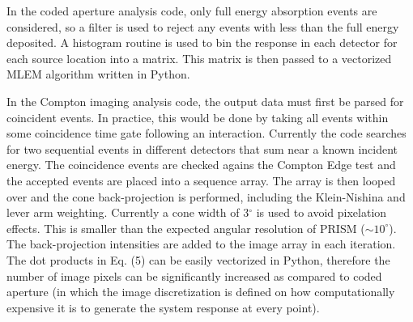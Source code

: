 \documentclass[10pt]{article}
\begin{document}

In the coded aperture analysis code, only full energy absorption events are considered, so a filter is used to reject any events with less than the full energy deposited. A histogram routine is used to bin the response in each detector for each source location into a matrix. This matrix is then passed to a vectorized MLEM algorithm written in Python.

%

In the Compton imaging analysis code, the output data must first be parsed for coincident events. In practice, this would be done by taking all events within some coincidence time gate following an interaction. Currently the code searches for two sequential events in different detectors that sum near a known incident energy. The coincidence events are checked agains the Compton Edge test and the accepted events are placed into a sequence array. The array is then looped over and the cone back-projection is performed, including the Klein-Nishina and lever arm weighting. Currently a cone width of 3$^\circ$ is used to avoid pixelation effects. This is smaller than the expected angular resolution of PRISM ($\sim10^\circ$). The back-projection intensities are added to the image array in each iteration. The dot products in Eq. (5) can be easily vectorized in Python, therefore the number of image pixels can be significantly increased as compared to coded aperture (in which the image discretization is defined on how computationally expensive it is to generate the system response at every point).
\end{document}

